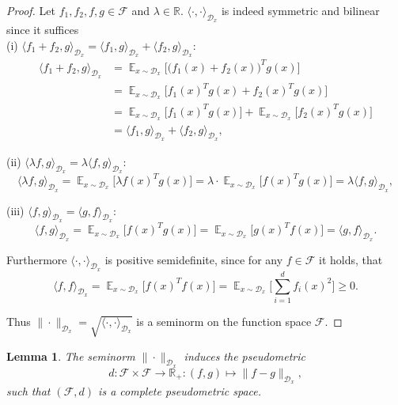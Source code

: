 \documentclass[11pt, a4paper]{article}
\newtheorem{lemma}[theorem]{Lemma}
\newcommand{\R}{\mathds{R}}
\newcommand{\D}{\mathcal{D}}
\newcommand{\F}{\mathcal{F}}
\DeclareMathOperator*{\E}{\mathds{E}}
\begin{document}
\begin{proof}
Let $f_1, f_2, f, g \in \F$ and $\lambda \in \R$. $\langle \cdot,\cdot \rangle_{\D_x}$ is indeed symmetric and bilinear since it suffices \\

(i) $\langle f_1 + f_2 , g \rangle_{\D_x} = \langle f_1 , g \rangle_{\D_x} + \langle f_2 , g \rangle_{\D_x}$:
\[ \begin{split}
\langle f_1 + f_2 , g \rangle_{\D_x}
&= \E_{x \sim \D_x} \Big [ \big ( f_1(x) + f_2(x) \big )^Tg(x) \Big ] \\\
&= \E_{x \sim \D_x} \Big [ f_1(x)^Tg(x) + f_2(x)^Tg(x) \Big ] \\\
&= \E_{x \sim \D_x} \Big [ f_1(x)^Tg(x) \Big ] + \E_{x \sim \D_x} \Big [ f_2(x)^Tg(x) \Big ] \\\
&= \langle f_1 , g \rangle_{\D_x} + \langle f_2 , g \rangle_{\D_x},
\end{split} \]

(ii) $\langle \lambda f , g \rangle_{\D_x} = \lambda \langle f, g \rangle_{\D_x}$:
\[ \langle \lambda f , g \rangle_{\D_x} = \E_{x \sim \D_x} \Big [ \lambda f(x)^Tg(x) \Big ] = \lambda \cdot \E_{x \sim \D_x} \Big [ f(x)^Tg(x) \Big ] = \lambda \langle f, g \rangle_{\D_x}, \]

(iii) $\langle f , g \rangle_{\D_x} = \langle g , f \rangle_{\D_x}$:
\[ \langle f , g \rangle_{\D_x} = \E_{x \sim \D_x} \Big [ f(x)^Tg(x) \Big ] = \E_{x \sim \D_x} \Big [ g(x)^Tf(x) \Big ] = \langle g , f \rangle_{\D_x}. \]

Furthermore $\langle \cdot,\cdot \rangle_{\D_x}$ is positive semidefinite, since for any $f \in \F$ it holds, that
\[ \langle f , f \rangle_{\D_x} =  \E_{x \sim \D_x} \Big [ f(x)^Tf(x) \Big ] = \E_{x \sim \D_x} \Big [ \sum_{i=1}^{d} f_i(x)^2 \Big ] \geq 0. \]

Thus $\| \cdot \|_{\D_x} = \sqrt{\langle \cdot , \cdot \rangle_{\D_x}}$ is a seminorm on the function space $\F$.
\end{proof}

\begin{lemma}
The seminorm $\| \cdot \|_{\D_x}$ induces the pseudometric
\[ d: \F \times \F \to \R_+ : (f,g) \mapsto \big \| f-g \big \|_{\D_x}, \]
such that $(\F,d)$ is a complete pseudometric space.
\end{lemma}
\end{document}
